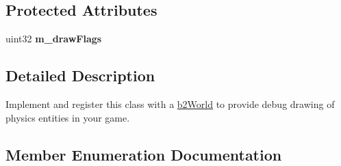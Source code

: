 \subsection*{Protected Attributes}
\begin{DoxyCompactItemize}
\item 
uint32 {\bfseries m\+\_\+draw\+Flags}\hypertarget{classb2_draw_adfcd2e54ddaec6f0a111ec1a1cf8b9a0}{}\label{classb2_draw_adfcd2e54ddaec6f0a111ec1a1cf8b9a0}

\end{DoxyCompactItemize}


\subsection{Detailed Description}
Implement and register this class with a \hyperlink{classb2_world}{b2\+World} to provide debug drawing of physics entities in your game. 

\subsection{Member Enumeration Documentation}
